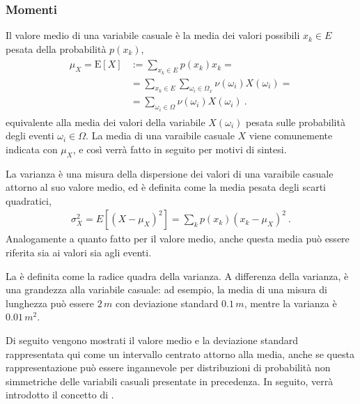 \documentclass[letterpaper,10pt,italian]{jupyterBook}
\begin{document}
\subsubsection{Momenti}
\label{\detokenize{ch/statistics/random_variables_discrete:momenti}}
\sphinxAtStartPar
{} Il valore medio di una variabile casuale è la media dei valori possibili \(x_k \in E\) pesata della probabilità \(p(x_k)\),
\begin{equation*}
\begin{split}\begin{aligned}
 \mu_X = \text{E}[X] 
  & := \sum_{x_k \in E} p(x_k) x_k = \\
  & = \sum_{x_k \in E} \sum_{\omega_i \in \Omega_x} \nu(\omega_i) X(\omega_i) = \\
  & = \sum_{\omega_i \in \Omega} \nu(\omega_i) X(\omega_i) \ .
\end{aligned}\end{split}
\end{equation*}
\sphinxAtStartPar
equivalente alla media dei valori della variabile \(X(\omega_i)\) pesata sulle probabilità degli eventi \(\omega_i \in \Omega\). La media di una varaibile casuale \(X\) viene comunemente indicata con \(\mu_X\), e così verrà fatto in seguito per motivi di sintesi.

\sphinxAtStartPar
{} La varianza è una misura della dispersione dei valori di una varaibile casuale attorno al suo valore medio, ed è definita come la media pesata degli scarti quadratici,
\begin{equation*}
\begin{split}\sigma^2_X = E[(X-\mu_X)^2] = \sum_k p(x_k) (x_k - \mu_X)^2 \ .\end{split}
\end{equation*}
\sphinxAtStartPar
Analogamente a quanto fatto per il valore medio, anche questa media può essere riferita sia ai valori sia agli eventi.

\sphinxAtStartPar
La  è definita come la radice quadra della varianza. A differenza della varianza, è una grandezza  \sphinxstylestrong{(!)} alla variabile casuale: ad esempio, la media di una misura di lunghezza può essere \(2 \, m\) con deviazione standard \(0.1 \, m\), mentre la varianza è \(0.01 \, m^2\).

\sphinxAtStartPar
Di seguito vengono mostrati il valore medio e la deviazione standard \sphinxhyphen{} rappresentata qui come un intervallo centrato attorno alla media, anche se questa rappresentazione può essere ingannevole \sphinxstylestrong{(!)} per distribuzioni di probabilità non simmetriche \sphinxhyphen{} delle variabili casuali presentate in precedenza. In seguito, verrà introdotto il concetto di .  
\end{document}
